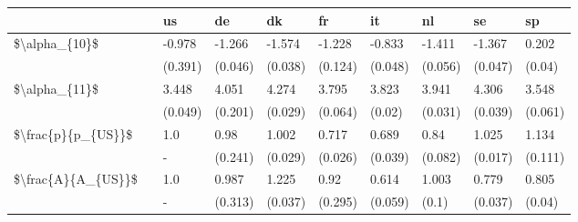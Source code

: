 \begin{tabular}{llllllllll}
\toprule
                   & {} &       us &       de &       dk &       fr &       it &       nl &       se &       sp \\
\midrule
\$\textbackslash alpha\_\{10\}\$ & {} &   -0.978 &   -1.266 &   -1.574 &   -1.228 &   -0.833 &   -1.411 &   -1.367 &    0.202 \\
                   & {} &  (0.391) &  (0.046) &  (0.038) &  (0.124) &  (0.048) &  (0.056) &  (0.047) &   (0.04) \\
\$\textbackslash alpha\_\{11\}\$ & {} &    3.448 &    4.051 &    4.274 &    3.795 &    3.823 &    3.941 &    4.306 &    3.548 \\
                   & {} &  (0.049) &  (0.201) &  (0.029) &  (0.064) &   (0.02) &  (0.031) &  (0.039) &  (0.061) \\
\$\textbackslash frac\{p\}\{p\_\{US\}\}\$ & {} &      1.0 &     0.98 &    1.002 &    0.717 &    0.689 &     0.84 &    1.025 &    1.134 \\
                   & {} &        - &  (0.241) &  (0.029) &  (0.026) &  (0.039) &  (0.082) &  (0.017) &  (0.111) \\
\$\textbackslash frac\{A\}\{A\_\{US\}\}\$ & {} &      1.0 &    0.987 &    1.225 &     0.92 &    0.614 &    1.003 &    0.779 &    0.805 \\
                   & {} &        - &  (0.313) &  (0.037) &  (0.295) &  (0.059) &    (0.1) &  (0.037) &   (0.04) \\
\bottomrule
\end{tabular}
